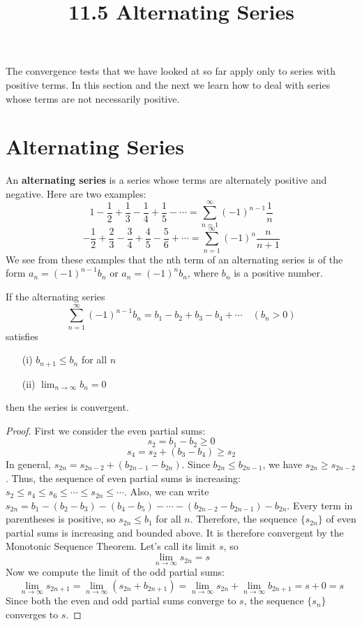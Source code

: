 \documentclass{article}
\title{11.5 Alternating Series}
\date{}
\author{}
\theoremstyle{mystyle}
\begin{document}
\maketitle

The convergence tests that we have looked at so far apply only to series with positive terms. In this section and the next we learn how to deal with series whose terms are not necessarily positive.

\section*{Alternating Series}
An \textbf{alternating series} is a series whose terms are alternately positive and negative. Here are two examples:
\[ 1 - \frac{1}{2} + \frac{1}{3} - \frac{1}{4} + \frac{1}{5} - \cdots = \sum_{n=1}^{\infty} (-1)^{n-1} \frac{1}{n} \]
\[ -\frac{1}{2} + \frac{2}{3} - \frac{3}{4} + \frac{4}{5} - \frac{5}{6} + \cdots = \sum_{n=1}^{\infty} (-1)^{n} \frac{n}{n+1} \]
We see from these examples that the nth term of an alternating series is of the form \( a_n = (-1)^{n-1}b_n \) or \( a_n = (-1)^n b_n \), where \(b_n\) is a positive number.

\begin{tcolorbox}[
    colback=white,
    colframe=orange!80!white,
    title=The Alternating Series Test,
    boxrule=0.5mm,
    arc=3mm
    ]
    If the alternating series
    \[ \sum_{n=1}^{\infty} (-1)^{n-1}b_n = b_1 - b_2 + b_3 - b_4 + \cdots \quad (b_n > 0) \]
    satisfies
    \begin{itemize}
        \item[(i)] \( b_{n+1} \le b_n \) for all \(n\)
        \item[(ii)] \( \lim_{n\to\infty} b_n = 0 \)
    \end{itemize}
    then the series is convergent.
\end{tcolorbox}

\begin{proof}
[Proof]
First we consider the even partial sums:
\[ s_2 = b_1 - b_2 \ge 0 \]
\[ s_4 = s_2 + (b_3 - b_4) \ge s_2 \]
In general, \( s_{2n} = s_{2n-2} + (b_{2n-1} - b_{2n}) \). Since \(b_{2n} \le b_{2n-1}\), we have \(s_{2n} \ge s_{2n-2}\).
Thus, the sequence of even partial sums is increasing: \( s_2 \le s_4 \le s_6 \le \cdots \le s_{2n} \le \cdots \).
Also, we can write \( s_{2n} = b_1 - (b_2 - b_3) - (b_4 - b_5) - \cdots - (b_{2n-2} - b_{2n-1}) - b_{2n} \).
Every term in parentheses is positive, so \( s_{2n} \le b_1 \) for all \(n\).
Therefore, the sequence \(\{s_{2n}\}\) of even partial sums is increasing and bounded above. It is therefore convergent by the Monotonic Sequence Theorem. Let's call its limit \(s\), so
\[ \lim_{n\to\infty} s_{2n} = s \]
Now we compute the limit of the odd partial sums:
\[ \lim_{n\to\infty} s_{2n+1} = \lim_{n\to\infty} (s_{2n} + b_{2n+1}) = \lim_{n\to\infty} s_{2n} + \lim_{n\to\infty} b_{2n+1} = s + 0 = s \]
Since both the even and odd partial sums converge to \(s\), the sequence \(\{s_n\}\) converges to \(s\).
\end{proof}
\end{document}
